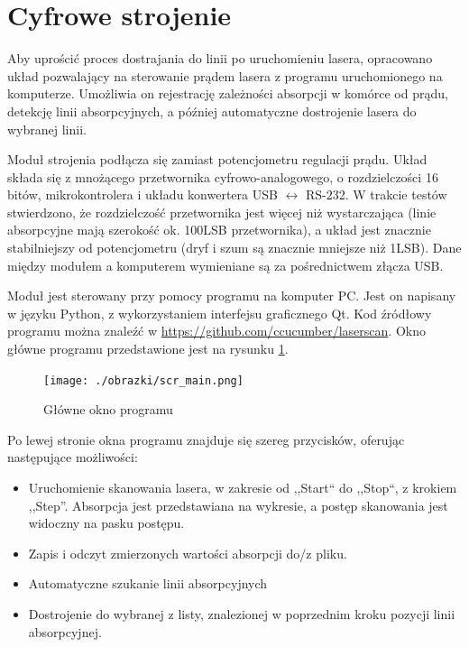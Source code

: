 \documentclass[a4paper,10pt,twoside]{report}
\begin{document}
\section{Cyfrowe strojenie}

Aby uprościć proces dostrajania do linii po uruchomieniu lasera, opracowano układ pozwalający na sterowanie prądem lasera z programu uruchomionego na komputerze.
Umożliwia on rejestrację zależności absorpcji w komórce od prądu, detekcję linii absorpcyjnych, a później automatyczne dostrojenie lasera do wybranej linii.

Moduł strojenia podłącza się zamiast potencjometru regulacji prądu. Układ składa się z mnożącego przetwornika cyfrowo-analogowego, o rozdzielczości 16 bitów, mikrokontrolera i układu konwertera USB $\leftrightarrow$ RS-232. W trakcie testów stwierdzono, że rozdzielczość przetwornika jest więcej niż wystarczająca (linie absorpcyjne mają szerokość ok. 100LSB przetwornika), a układ jest znacznie stabilniejszy od potencjometru (dryf i szum są znacznie mniejsze niż 1LSB). Dane między modułem a komputerem wymieniane są za pośrednictwem złącza USB.

Moduł jest sterowany przy pomocy programu na komputer PC. Jest on napisany w języku Python, z wykorzystaniem interfejsu graficznego Qt. Kod źródłowy programu można znaleźć w \url{https://github.com/ccucumber/laserscan}. Okno główne programu przedstawione jest na rysunku \ref{scr-main}.

\begin{figure}
\begin{center}
 \texttt{[image: ./obrazki/scr\_main.png]}
\end{center}
\caption{Główne okno programu}
\label{scr-main}
\end{figure}


Po lewej stronie okna programu znajduje się szereg przycisków, oferując następujące możliwości:

\begin{itemize}
 \item Uruchomienie skanowania lasera, w zakresie od ,,Start`` do ,,Stop``, z krokiem ,,Step''. Absorpcja jest przedstawiana na wykresie, a postęp skanowania jest widoczny na pasku postępu.
 \item Zapis i odczyt zmierzonych wartości absorpcji do/z pliku.
 \item Automatyczne szukanie linii absorpcyjnych
 \item Dostrojenie do wybranej z listy, znalezionej w poprzednim kroku pozycji linii absorpcyjnej.
\end{itemize}
\end{document}
